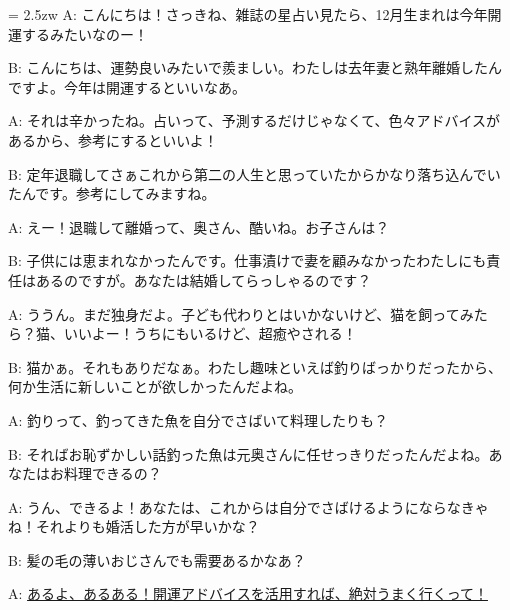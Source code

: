 \documentclass[11pt]{amsart}
\title{}
\author{}
\newenvironment{hangall}[1]{\hangindent = 2.5zw\everypar{\hangindent = 2.5zw}}{}
\begin{document}
\maketitle
\begin{hangall}{}%
A: こんにちは！さっきね、雑誌の星占い見たら、12月生まれは今年開運するみたいなのー！

B: こんにちは、運勢良いみたいで羨ましい。わたしは去年妻と熟年離婚したんですよ。今年は開運するといいなあ。

A: それは辛かったね。占いって、予測するだけじゃなくて、色々アドバイスがあるから、参考にするといいよ！

B: 定年退職してさぁこれから第二の人生と思っていたからかなり落ち込んでいたんです。参考にしてみますね。

A: えー！退職して離婚って、奥さん、酷いね。お子さんは？

B: 子供には恵まれなかったんです。仕事漬けで妻を顧みなかったわたしにも責任はあるのですが。あなたは結婚してらっしゃるのです？

A: ううん。まだ独身だよ。子ども代わりとはいかないけど、猫を飼ってみたら？猫、いいよー！うちにもいるけど、超癒やされる！

B: 猫かぁ。それもありだなぁ。わたし趣味といえば釣りばっかりだったから、何か生活に新しいことが欲しかったんだよね。

A: 釣りって、釣ってきた魚を自分でさばいて料理したりも？

B: そればお恥ずかしい話釣った魚は元奥さんに任せっきりだったんだよね。あなたはお料理できるの？

A: うん、できるよ！あなたは、これからは自分でさばけるようにならなきゃね！それよりも婚活した方が早いかな？

B: 髪の毛の薄いおじさんでも需要あるかなあ？

A: \ul{あるよ、あるある！開運アドバイスを活用すれば、絶対うまく行くって！}\end{hangall}
\end{document}
